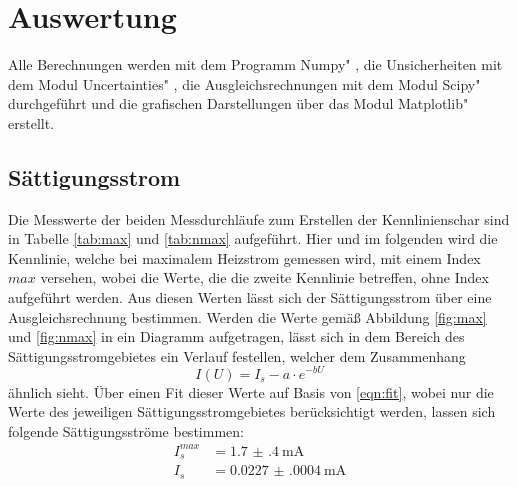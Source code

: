 \section{Auswertung}
\label{sec:Auswertung}
Alle Berechnungen werden mit dem Programm \glqq Numpy" \cite{numpy}, die Unsicherheiten mit dem Modul \glqq Uncertainties" \cite{uncertainties}, die Ausgleichsrechnungen mit dem Modul \glqq Scipy" \cite{scipy} durchgeführt und die grafischen Darstellungen über das Modul \glqq Matplotlib" \cite{matplotlib} erstellt.


\subsection{Sättigungsstrom}
\label{sub:Sättigungsstrom}

Die Messwerte der beiden Messdurchläufe zum Erstellen der Kennlinienschar sind in Tabelle \ref{tab:max} und \ref{tab:nmax} aufgeführt. Hier und im folgenden wird die Kennlinie, welche bei maximalem Heizstrom gemessen wird, mit einem Index $max$ versehen, wobei die Werte, die die zweite Kennlinie betreffen, ohne Index aufgeführt werden. Aus diesen Werten lässt sich der Sättigungsstrom über eine Ausgleichsrechnung bestimmen. Werden die Werte gemäß Abbildung \ref{fig:max} und \ref{fig:nmax} in ein Diagramm aufgetragen, lässt sich in dem Bereich des Sättigungsstromgebietes ein Verlauf festellen, welcher dem Zusammenhang
\begin{equation}
    I(U)=I_s-a\cdot e^{-bU}
    \label{eqn:fit}
\end{equation}
ähnlich sieht. Über einen Fit dieser Werte auf Basis von \ref{eqn:fit}, wobei nur die Werte des jeweiligen Sättigungsstromgebietes berücksichtigt werden, lassen sich folgende Sättigungsströme bestimmen:
\begin{align*}
I_s^{max}& = \SI{1.7(4)}{\milli\A}  \\
I_s& = \SI{0.0227(0004)}{\milli\A}
\end{align*}


